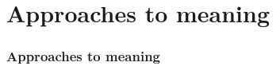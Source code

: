 \documentclass{beamer}
\begin{document}
\section{Approaches to meaning}

\begin{frame}
\frametitle{Approaches to meaning}
\end{frame}
\end{document}
